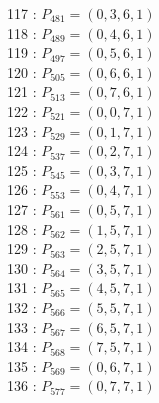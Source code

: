 \documentclass{article}
\begin{document}
{\begin{multicols}{3}
117 : $P_{481}=( 0, 3, 6, 1 )$\\
118 : $P_{489}=( 0, 4, 6, 1 )$\\
119 : $P_{497}=( 0, 5, 6, 1 )$\\
120 : $P_{505}=( 0, 6, 6, 1 )$\\
121 : $P_{513}=( 0, 7, 6, 1 )$\\
122 : $P_{521}=( 0, 0, 7, 1 )$\\
123 : $P_{529}=( 0, 1, 7, 1 )$\\
124 : $P_{537}=( 0, 2, 7, 1 )$\\
125 : $P_{545}=( 0, 3, 7, 1 )$\\
126 : $P_{553}=( 0, 4, 7, 1 )$\\
127 : $P_{561}=( 0, 5, 7, 1 )$\\
128 : $P_{562}=( 1, 5, 7, 1 )$\\
129 : $P_{563}=( 2, 5, 7, 1 )$\\
130 : $P_{564}=( 3, 5, 7, 1 )$\\
131 : $P_{565}=( 4, 5, 7, 1 )$\\
132 : $P_{566}=( 5, 5, 7, 1 )$\\
133 : $P_{567}=( 6, 5, 7, 1 )$\\
134 : $P_{568}=( 7, 5, 7, 1 )$\\
135 : $P_{569}=( 0, 6, 7, 1 )$\\
136 : $P_{577}=( 0, 7, 7, 1 )$\\
\end{multicols}


%


%


}%
\end{document}

